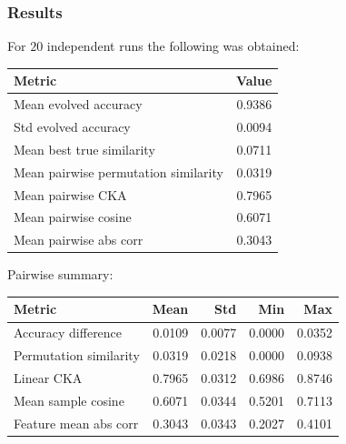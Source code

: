 \subsubsection{Results}

For $20$ independent runs the following was obtained:

\begin{center}
\begin{tabular}{lr}
\toprule
Metric & Value \\
\midrule
Mean evolved accuracy & 0.9386 \\
Std evolved accuracy & 0.0094 \\
Mean best true similarity & 0.0711 \\
Mean pairwise permutation similarity & 0.0319 \\
Mean pairwise CKA & 0.7965 \\
Mean pairwise cosine & 0.6071 \\
Mean pairwise abs corr & 0.3043 \\
\bottomrule
\end{tabular}
\end{center}

Pairwise summary:

\begin{center}
\begin{tabular}{lrrrr}
\toprule
Metric & Mean & Std & Min & Max \\
\midrule
Accuracy difference & 0.0109 & 0.0077 & 0.0000 & 0.0352 \\
Permutation similarity & 0.0319 & 0.0218 & 0.0000 & 0.0938 \\
Linear CKA & 0.7965 & 0.0312 & 0.6986 & 0.8746 \\
Mean sample cosine & 0.6071 & 0.0344 & 0.5201 & 0.7113 \\
Feature mean abs corr & 0.3043 & 0.0343 & 0.2027 & 0.4101 \\
\bottomrule
\end{tabular}
\end{center}
